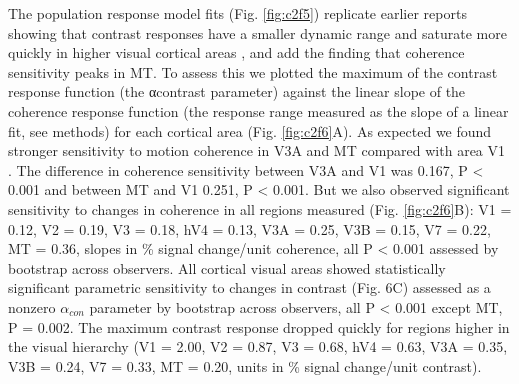 The population response model fits (Fig. \ref{fig:c2f5}) replicate earlier reports showing that contrast responses have a smaller dynamic range and saturate more quickly in higher visual cortical areas \citep{Avidan2002-jg}, and add the finding that coherence sensitivity peaks in MT. To assess this we plotted the maximum of the contrast response function (the αcontrast parameter) against the linear slope of the coherence response function (the response range measured as the slope of a linear fit, see methods) for each cortical area (Fig. \ref{fig:c2f6}A). As expected we found stronger sensitivity to motion coherence in V3A and MT compared with area V1 \citep{Dupont1994-yi,Tootell1998-mr,Watson1993-th,Zeki1991-zf}. The difference in coherence sensitivity between V3A and V1 was 0.167, P < 0.001 and between MT and V1 0.251, P < 0.001. But we also observed significant sensitivity to changes in coherence in all regions measured (Fig. \ref{fig:c2f6}B): V1 = 0.12, V2 = 0.19, V3 = 0.18, hV4 = 0.13, V3A = 0.25, V3B = 0.15, V7 = 0.22, MT = 0.36, slopes in \% signal change/unit coherence, all P < 0.001 assessed by bootstrap across observers. All cortical visual areas showed statistically significant parametric sensitivity to changes in contrast (Fig. 6C) assessed as a nonzero $\alpha_{con}$ parameter by bootstrap across observers, all P < 0.001 except MT, P = 0.002. The maximum contrast response dropped quickly for regions higher in the visual hierarchy (V1 = 2.00, V2 = 0.87, V3 = 0.68, hV4 = 0.63, V3A = 0.35, V3B = 0.24, V7 = 0.33, MT = 0.20, units in \% signal change/unit contrast).


